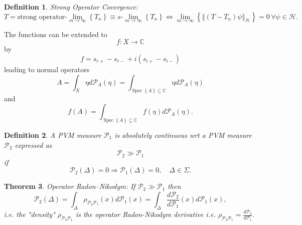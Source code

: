 \documentclass[aps,preprint]{revtex4}%
\newtheorem{theorem}{Theorem}
\newtheorem{definition}[theorem]{Definition}
\begin{document}
\begin{definition}
Strong Operator Covergence:%
\begin{equation}
T=\text{strong operator-}\lim\limits_{m\rightarrow\infty}\left\{
T_{n}\right\}  \equiv s\text{-}\lim\limits_{m\rightarrow\infty}\left\{
T_{n}\right\}  \Longleftrightarrow\lim\limits_{m\rightarrow\infty}\left\{
\left\Vert \left(  T-T_{n}\right)  \psi\right\Vert _{\mathcal{H}}\right\}
=0\,\forall\psi\in\mathcal{H}.
\end{equation}

\end{definition}

The functions can be extended to
\begin{equation}
f:X\rightarrow\mathbb{C}%
\end{equation}
by
\begin{equation}
f=s_{r+}-s_{r-}+i\left(  s_{i+}-s_{i-}\right)
\end{equation}
leading to normal operators
\begin{equation}
A=\int_{X}\eta d\mathcal{P}_{A}\left(  \eta\right)  =\int%
_{\operatorname*{Spec}\left\{  A\right\}  \subseteq\mathbb{C}}\eta
d\mathcal{P}_{A}\left(  \eta\right)
\end{equation}
and
\begin{equation}
f\left(  A\right)  =\int_{\operatorname*{Spec}\left\{  A\right\}
\subseteq\mathbb{C}}f\left(  \eta\right)  d\mathcal{P}_{A}\left(  \eta\right)
.
\end{equation}


\begin{definition}
A PVM measure $\mathcal{P}_{1}$ is \emph{absolutely continuous} wrt a PVM
measure $\mathcal{P}_{2}$ expressed as
\begin{equation}
\mathcal{P}_{2}\gg\mathcal{P}_{1}%
\end{equation}
if
\begin{equation}
\mathcal{P}_{2}\left(  \Delta\right)  =0\Rightarrow\mathcal{P}_{1}\left(
\Delta\right)  =0,\quad\Delta\in\Sigma.
\end{equation}

\end{definition}

\begin{theorem}
\emph{Operator} \emph{Radon--Nikodym}: If $\mathcal{P}_{2}\gg\mathcal{P}_{1}$
then
\begin{equation}
\mathcal{P}_{2}\left(  \Delta\right)  =\int_{\Delta}\rho_{\mathcal{P}%
_{2}\mathcal{P}_{1}}\left(  x\right)  d\mathcal{P}_{1}\left(  x\right)
=\int_{\Delta}\frac{d\mathcal{P}_{2}}{d\mathcal{P}_{1}}\left(  x\right)
d\mathcal{P}_{1}\left(  x\right)  ,
\end{equation}
i.e. the "density" $\rho_{\mathcal{P}_{2}\mathcal{P}_{1}}$ is the operator
Radon-Nikodym derivative i.e. $\rho_{\mathcal{P}_{2}\mathcal{P}_{1}}%
=\frac{d\mathcal{P}_{2}}{d\mathcal{P}_{1}}.$
\end{theorem}
\end{document}
